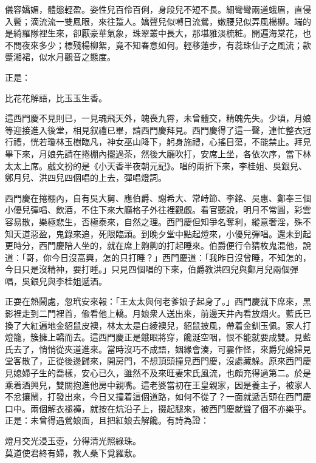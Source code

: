 \begin{myquote}
儀容嬌媚，體態輕盈。姿性兒百伶百俐，身段兒不短不長。細彎彎兩道蛾眉，直侵入鬢；滴流流一雙鳳眼，來往踅人。嬌聲兒似囀日流鶯，嫩腰兒似弄風楊柳。端的是綺羅隊裡生來，卻厭豪華氣象，珠翠叢中長大，那堪雅淡梳粧。開遍海棠花，也不問夜來多少；標殘楊柳絮，竟不知春意如何。輕移蓮步，有蕊珠仙子之風流；款蹙湘裙，似水月觀音之態度。{}
\end{myquote}

正是：

\begin{myquote}
比花花解語，比玉玉生香。
\end{myquote}

這西門慶不見則已，一見魂飛天外，魄䘮九霄，未曾體交，精魄先失。少頃，月娘等迎接進入後堂，相見叙禮已畢，請西門慶拜見。西門慶得了這一聲，連忙整衣冠行禮，恍若瓊林玉樹臨凡，神女巫山降下，躬身施禮，心搖目蕩，不能禁止。{}拜見畢下來，月娘先請在捲棚內擺過茶，然後大廳吹打，安席上坐，各依次序，當下林太太上席。戲文扮的是《小天香半夜朝元記》。唱的兩折下來，李桂姐、吳銀兒、鄭月兒、洪四兒四個唱的上去，彈唱燈詞。

西門慶在捲棚內，自有吳大舅、應伯爵、謝希大、常峙節、李銘、吳惠、鄭奉三個小優兒彈唱、飲酒，不住下來大廳格子外往裡觀覷。看官聽說，明月不常圓，彩雲容易散，樂極悲生，否極泰來，自然之理。西門慶但知爭名奪利，縱意奢淫，殊不知天道惡盈，鬼錄來追，死限臨頭。{}到晚夕堂中點起燈來，小優兒彈唱。還未到起更時分，西門慶陪人坐的，就在席上齁齁的打起睡來。伯爵便行令猜枚鬼混他，說道：「哥，你今日沒高興，怎的只打睡？」西門慶道：「我昨日沒曾睡，不知怎的，今日只是沒精神，要打睡。」只見四個唱的下來，伯爵教洪四兒與鄭月兒兩個彈唱，吳銀兒與李桂姐遞酒。

正耍在熱鬧處，忽玳安來報：「王太太與何老爹娘子起身了。」{}西門慶就下席來，黑影裡走到二門裡首，偸看他上轎。月娘衆人送出來，前邊天井內看放烟火。藍氏已換了大紅遍地金貂鼠皮襖，林太太是白綾襖兒，貂鼠披風，帶着金釧玉佩。家人打燈籠，簇擁上轎而去。這西門慶正是餓眼將穿，饞涎空咽，恨不能就要成雙。見藍氏去了，悄悄從夾道進來。當時沒巧不成語，姻緣會湊，可霎作怪，來爵兒媳婦見堂客散了，正從後邊歸來，開房門，不想頂頭撞見西門慶，沒處藏躲。原來西門慶見媳婦子生的喬樣，安心已久，雖然不及來旺妻宋氏風流，也頗充得過第二。於是乘着酒興兒，雙關抱進他房中親嘴。這老婆當初在王皇親家，因是養主子，被家人不忿攘鬧，打發出來，今日又撞着這個道路，如何不從了？{}一面就遞舌頭在西門慶口中。兩個解衣褪褲，就按在炕沿子上，掇起腿來，被西門慶就聳了個不亦樂乎。{}正是：未曾得遇鶯娘面，且把紅娘去解饞。有詩為證：

\begin{myquote}
燈月交光浸玉壺，分得清光照綠珠。\\莫道使君終有婦，教人桑下覓羅敷。
\end{myquote}
